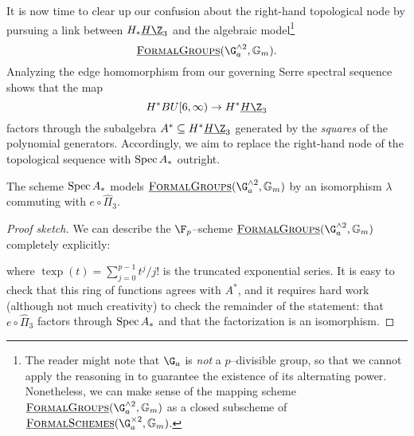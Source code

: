It is now time to clear up our confusion about the right-hand topological node by pursuing a link between \(H_* \OS{H\Z}{3}\) and the algebraic model\footnote{The reader might note that \(\G_a\) is \emph{not} a \(p\)--divisible group, so that we cannot apply the reasoning in  to guarantee the existence of its alternating power.  Nonetheless, we can make sense of the mapping scheme \(\InternalHom{FormalGroups}(\G_a^{\sm 2}, \Gm)\) as a closed subscheme of \(\InternalHom{FormalSchemes}(\G_a^{\times 2}, \Gm)\).} \[\InternalHom{FormalGroups}(\G_a^{\sm 2}, \Gm).\]  Analyzing the edge homomorphism from our governing Serre spectral sequence shows that the map \[H^* BU[6, \infty) \to H^* \OS{H\Z}{3}\] factors through the subalgebra \(A^* \subseteq H^* \OS{H\Z}{3}\) generated by the \emph{squares} of the polynomial generators.  Accordingly, we aim to replace the right-hand node of the topological sequence with \(\operatorname{Spec} A_*\) outright.

\begin{lemma}
The scheme \(\operatorname{Spec} A_*\) models \(\InternalHom{FormalGroups}(\G_a^{\sm 2}, \Gm)\) by an isomorphism \(\lambda\) commuting with \(e \circ \hat \Pi_3\).
\end{lemma}
\begin{proof}[Proof sketch]
We can describe the \(\F_p\)--scheme \(\InternalHom{FormalGroups}(\G_a^{\sm 2}, \Gm)\) completely explicitly:
\begin{center}
\end{center}
where \(\operatorname{texp}(t) = \sum_{j=0}^{p-1} t^j / j!\) is the truncated exponential series.  It is easy to check that this ring of functions agrees with \(A^*\), and it requires hard work (although not much creativity) to check the remainder of the statement: that \(e \circ \hat \Pi_3\) factors through \(\operatorname{Spec} A_*\) and that the factorization is an isomorphism.
\end{proof}

